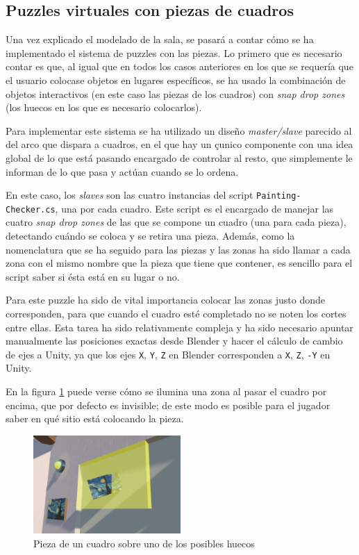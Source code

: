 \subsection{Puzzles virtuales con piezas de cuadros}

Una vez explicado el modelado de la sala, se pasará a contar cómo se ha implementado el sistema de puzzles con las piezas. Lo primero que es necesario contar es que, al igual que en todos los casos anteriores en los que se requería que el usuario colocase objetos en lugares específicos, se ha usado la combinación de objetos interactivos (en este caso las piezas de los cuadros) con \textit{snap drop zones} (los huecos en los que es necesario colocarlos).

Para implementar este sistema se ha utilizado un diseño \textit{master/slave} parecido al del arco que dispara a cuadros, en el que hay un çunico componente con una idea global de lo que está pasando encargado de controlar al resto, que simplemente le informan de lo que pasa y actúan cuando se lo ordena.

En este caso, los \textit{slaves} son las cuatro instancias del script \texttt{Painting-} \texttt{Checker.cs}, una por cada cuadro. Este script es el encargado de manejar las cuatro \textit{snap drop zones} de las que se compone un cuadro (una para cada pieza), detectando cuándo se coloca y se retira una pieza. Además, como la nomenclatura que se ha seguido para las piezas y las zonas ha sido llamar a cada zona con el mismo nombre que la pieza que tiene que contener, es sencillo para el script saber si ésta está en su lugar o no.

Para este puzzle ha sido de vital importancia colocar las zonas justo donde corresponden, para que cuando el cuadro esté completado no se noten los cortes entre ellas. Esta tarea ha sido relativamente compleja y ha sido necesario apuntar manualmente las posiciones exactas desde Blender y hacer el cálculo de cambio de ejes a Unity, ya que los ejes \texttt{X}, \texttt{Y}, \texttt{Z} en Blender corresponden a \texttt{X}, \texttt{Z}, \texttt{-Y} en Unity.

En la figura \ref{fig:painting-piece-hover} puede verse cómo se ilumina una zona al pasar el cuadro por encima, que por defecto es invisible; de este modo es posible para el jugador saber en qué sitio está colocando la pieza.

\begin{figure}[!h]
\begin{center}
\includegraphics[width=0.5\textwidth]{imagenes/7/painting-piece-hover.png}
\caption{Pieza de un cuadro sobre uno de los posibles huecos}
\label{fig:painting-piece-hover}
\end{center}
\vspace{-0.5cm}
\end{figure}

